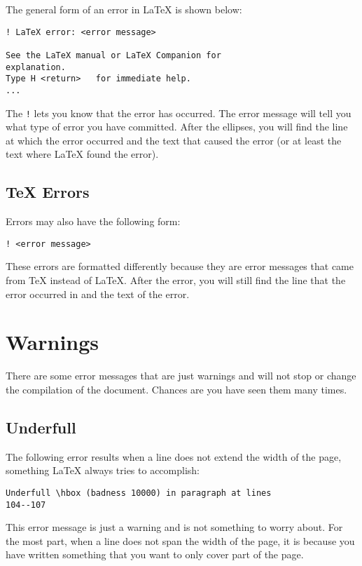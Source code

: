 \documentclass[class=article , crop=false, titlepage, twoside, multi={itemize, figure, verbatim}, float=false]{standalone}
\begin{document}
The general form of an error in \LaTeX{} is shown below:
\begin{verbatim}
! LaTeX error: <error message>

See the LaTeX manual or LaTeX Companion for
explanation.
Type H <return>   for immediate help.
...
\end{verbatim}

The \texttt{!} lets you know that the error has occurred.  The error
message will tell you what type of error you have committed.  After
the ellipses, you will find the line at which the error occurred and
the text that caused the error (or at least the text where \LaTeX{}
found the error).

\subsection{\TeX{} Errors}
\label{sec:tex-errors}

Errors may also have the following form:
\begin{verbatim}
! <error message>
\end{verbatim}

These errors are formatted differently because they are error messages
that came from \TeX{} instead of \LaTeX{}.  After the error, you will
still find the line that the error occurred in and the text of the
error.

\section{Warnings}
\label{sec:warnings}

There are some error messages that are just warnings and will not stop
or change the compilation of the document.  Chances are you have seen
them many times.

\subsection{Underfull}
\label{sec:underfull}

The following error results when a line does not extend the width of
the page, something \LaTeX{} always tries to accomplish:
\begin{verbatim}
Underfull \hbox (badness 10000) in paragraph at lines
104--107
\end{verbatim}

This error message is just a warning and is not something to worry
about.  For the most part, when a line does not span the width of the
page, it is because you have written something that you want to only
cover part of the page.
\end{document}
